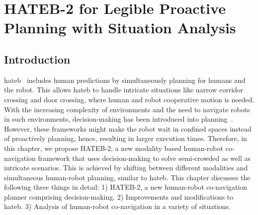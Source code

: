 \ifdefined{}
\else
\setcounter{chapter}{2} %
\dominitoc
\faketableofcontents
\fi

\chapter{HATEB-2 for Legible Proactive Planning with Situation Analysis}
\minitoc
{}
\label{chap:3}
\section{Introduction}



\acrfull{hateb}~\cite{khambhaita2017viewing} includes human predictions by simultaneously planning for humans and the robot. This allows \acrshort{hateb} to handle intricate situations like narrow corridor crossing and door crossing, where human and robot cooperative motion is needed. With the increasing complexity of environments and the need to navigate robots in such environments, decision-making has been introduced into planning~\cite{qian2013decision, mehta2016autonomous}. However, these frameworks might make the robot wait in confined spaces instead of proactively planning, hence, resulting in larger execution times. Therefore, in this chapter, we propose HATEB-2, a new modality based human-robot co-navigation framework that uses decision-making to solve semi-crowded as well as intricate scenarios. This is achieved by shifting between different modalities and simultaneous human-robot planning, similar to \acrshort{hateb}. This chapter discusses the following three things in detail: 1) HATEB-2, a new human-robot co-navigation planner comprising decision-making. 2) Improvements and modifications to \acrshort{hateb}. 3) Analysis of human-robot co-navigation in a variety of situations. 

